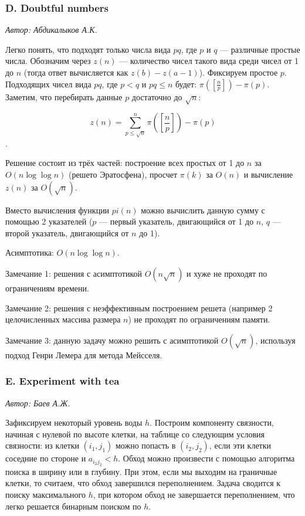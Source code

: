 \documentclass[10pt, a4paper]{article}
\newcommand{\problemauthor}[1]{
\begin{flushright}
\textit{Автор: #1}
\end{flushright}
}
\begin{document}
\subsubsection*{D. Doubtful numbers} 

\problemauthor{ Абдикалыков А.К.}

Легко понять, что подходят только числа вида $pq$, где $p$ и $q$ --- различные простые числа. Обозначим через $z(n)$ --- количество чисел такого вида среди чисел от 1 до $n$ (тогда ответ вычисляется как $z(b) - z(a-1)$). Фиксируем простое $p$. Подходящих чисел вида $pq$, где $p < q$ и $pq \le n$ будет: $ \pi\left( \left[ \frac{n}{p} \right] \right) - \pi(p)$. Заметим, что перебирать данные $p$ достаточно до $\sqrt{n}$:

$$z(n) = \sum_{p \le \sqrt{n}}^{n} \pi\left(\left[ \frac{n}{p} \right] \right) - \pi(p)$$.

Решение состоит из трёх частей: построение всех простых от 1 до $n$ за $O(n \log \log{n})$ (решето Эратосфена), просчет $\pi(k)$ за $O(n)$ и вычисление $z(n)$ за $O(\sqrt{n})$. 

Вместо вычисления функции $pi(n)$ можно вычислить данную сумму с помощью 2 указателей ($p$ --- первый указатель, двигающийся от 1 до $n$, $q$ --- второй указатель, двигающийся от $n$ до 1).

Асимптотика: $O(n \log \log{n})$. 

Замечание 1: решения с асимптотикой $O(n \sqrt{n})$ и хуже не проходят по ограничениям времени.

Замечание 2: решения с неэффективным построением решета (например 2 целочисленных массива размера $n$) не проходят по ограничениям памяти.

Замечание 3: данную задачу можно решить с асимптотикой $O( \sqrt{n} )$, используя подход Генри Лемера для метода Мейсселя.



\subsubsection*{E. Experiment with tea} 

\problemauthor{ Баев А.Ж.}

Зафиксируем некоторый уровень воды $h$. Построим компоненту связности, начиная с нулевой по высоте клетки, на таблице со следующим условия связности: из клетки $(i_1, j_1)$ можно попасть в $(i_2, j_2)$, если эти клетки соседние по стороне и $a_{i_2 j_2} < h$. Обход можно произвести с помощью алгоритма поиска в ширину или в глубину. При этом, если мы выходим на граничные клетки, то считаем, что обход завершился переполнением. Задача сводится к поиску максимального $h$, при котором обход не завершается переполнением, что легко решается бинарным поиском по $h$.
\end{document}
